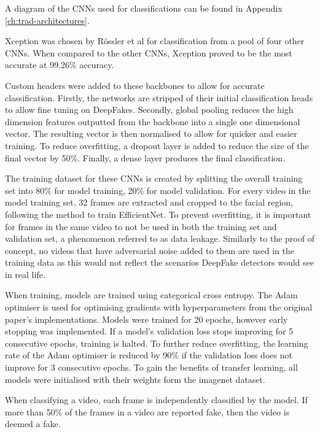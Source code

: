 A diagram of the CNNs used for classifications can be found in Appendix \ref{ch:trad-architectures}.

Xception was chosen by R\"{o}ssler et al for classification from a pool of four other CNNs. When compared to the other CNNs, Xception proved to be the most accurate at 99.26\% accuracy.

Custom headers were added to these backbones to allow for accurate classification. Firstly, the networks are stripped of their initial classification heads to allow fine tuning on DeepFakes. Secondly, global pooling reduces the high dimension features outputted from the backbone into a single one dimensional vector. The resulting vector is then normalised to allow for quicker and easier training. To reduce overfitting, a dropout layer is added to reduce the size of the final vector by 50\%. Finally, a dense layer produces the final classification.

The training dataset for these CNNs is created by splitting the overall training set into 80\% for model training, 20\% for model validation. For every video in the model training set, 32 frames are extracted and cropped to the facial region, following the method to train EfficientNet\cite{bonettini2021video}. To prevent overfitting, it is important for frames in the same video to not be used in both the training set and validation set, a phenomenon referred to as data leakage. Similarly to the proof of concept, no videos that have adversarial noise added to them are used in the training data as this would not reflect the scenarios DeepFake detectors would see in real life.

When training, models are trained using categorical cross entropy. The Adam\cite{kingma2014adam} optimiser is used for optimising gradients with hyperparameters from the original paper's implementations. Models were trained for 20 epochs, however early stopping was implemented. If a model's validation loss stops improving for 5 consecutive epochs, training is halted. To further reduce overfitting, the learning rate of the Adam optimiser is reduced by 90\% if the validation loss does not improve for 3 consecutive epochs. To gain the benefits of transfer learning, all models were initialised with their weights form the imagenet\cite{deng2009imagenet} dataset.

When classifying a video, each frame is independently classified by the model. If more than 50\% of the frames in a video are reported fake, then the video is deemed a fake.

